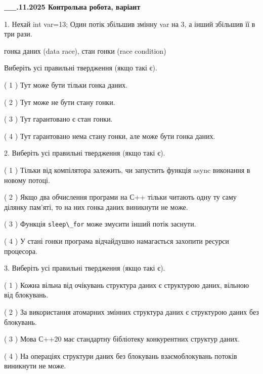 \documentclass[12pt, ukrainian]{article}
\def\code#1{\Verb!#1!}
\begin{document}
\newpage
\begin {large}

\textbf{\_\_.11.2025 Контрольна робота, варіант  }\par


{
1. Нехай int var=13; Один потік збільшив змінну var на 3, а інший збільшив її в три рази.

гонка даних (data race), стан гонки (race condition)

Виберіть усі правильні твердження (якщо такі є).\par
\vspace{2mm}
( 1 ) Тут може бути тільки гонка даних.%

( 2 ) Тут може не бути стану гонки.%

( 3 ) Тут гарантовано є стан гонки.%

( 4 ) Тут гарантовано нема стану гонки, але може бути гонка даних.%


2. Виберіть усі правильні твердження (якщо такі є).\par
\vspace{2mm}

( 1 ) Тільки від компілятора залежить, чи запустить функція async виконання в новому потоці.%

( 2 ) Якщо два обчислення програми на С++ тільки читають одну ту саму ділянку пам'яті, то на них гонка даних  виникнути не може.%

( 3 ) Функція \code{sleep\_for} може змусити інший потік заснути.%

( 4 ) У стані гонки програма відчайдушно намагається захопити ресурси процесора.%


3. Виберіть усі правильні твердження (якщо такі є).\par
\vspace{2mm}

( 1 ) Кожна вільна від очікувань структура даних є структурою даних, вільною від блокувань.%

( 2 ) За використання атомарних змінних структура даних є структурою даних без блокувань.%

( 3 ) Мова С++20 має стандартну бібліотеку конкурентних структур даних.%

( 4 ) На операціях структури даних без блокувань взаємоблокувань потоків виникнути не може.%


}
\end{large}
\end{document}
